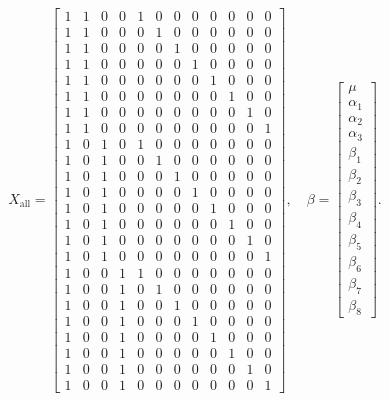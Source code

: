 {\footnotesize\setlength{\arraycolsep}{2.5pt}\renewcommand{\arraystretch}{.78}
\[X_{\mathrm{all}}=\begin{bmatrix}1&1&0&0&1&0&0&0&0&0&0&0\\1&1&0&0&0&1&0&0&0&0&0&0\\1&1&0&0&0&0&1&0&0&0&0&0\\1&1&0&0&0&0&0&1&0&0&0&0\\1&1&0&0&0&0&0&0&1&0&0&0\\1&1&0&0&0&0&0&0&0&1&0&0\\1&1&0&0&0&0&0&0&0&0&1&0\\1&1&0&0&0&0&0&0&0&0&0&1\\1&0&1&0&1&0&0&0&0&0&0&0\\1&0&1&0&0&1&0&0&0&0&0&0\\1&0&1&0&0&0&1&0&0&0&0&0\\1&0&1&0&0&0&0&1&0&0&0&0\\1&0&1&0&0&0&0&0&1&0&0&0\\1&0&1&0&0&0&0&0&0&1&0&0\\1&0&1&0&0&0&0&0&0&0&1&0\\1&0&1&0&0&0&0&0&0&0&0&1\\1&0&0&1&1&0&0&0&0&0&0&0\\1&0&0&1&0&1&0&0&0&0&0&0\\1&0&0&1&0&0&1&0&0&0&0&0\\1&0&0&1&0&0&0&1&0&0&0&0\\1&0&0&1&0&0&0&0&1&0&0&0\\1&0&0&1&0&0&0&0&0&1&0&0\\1&0&0&1&0&0&0&0&0&0&1&0\\1&0&0&1&0&0&0&0&0&0&0&1\end{bmatrix},\quad\beta=\begin{bmatrix}\mu\\\alpha_1\\\alpha_2\\\alpha_3\\\beta_1\\\beta_2\\\beta_3\\\beta_4\\\beta_5\\\beta_6\\\beta_7\\\beta_8\end{bmatrix}.\]
}

